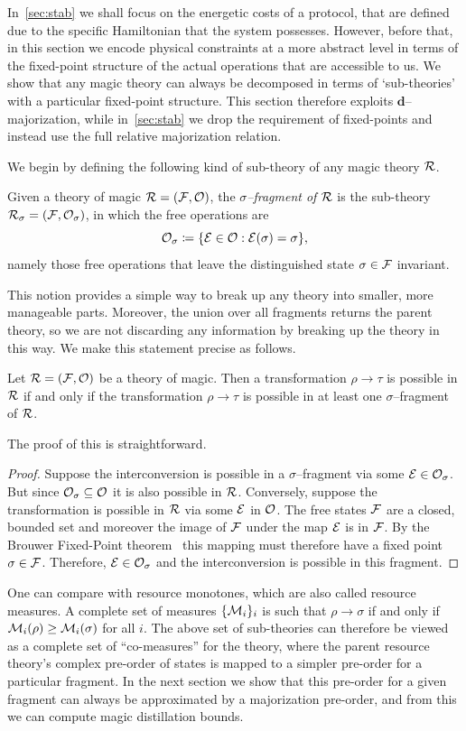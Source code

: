 \documentclass[pra,
aps,
twocolumn,
superscriptaddress,
groupedaddress,
nofootinbib,
reprint
]{revtex4-1}
\begin{document}
In~\cref{sec:stab} we shall focus on the energetic costs of a protocol, that are defined due to the specific Hamiltonian that the system possesses. However, before that, in this section we encode physical constraints at a more abstract level in terms of the fixed-point structure of  the actual operations that are accessible to us. We show that any magic theory can always be decomposed in terms of `sub-theories' with a particular fixed-point structure. This section therefore exploits $\mathbf{d}$--majorization, while in~\cref{sec:stab} we drop the requirement of fixed-points and instead use the full relative majorization relation.
 
 We begin by defining the following kind of sub-theory of any magic theory ${\mathcal R}$.
\begin{definition}\label{def:sigmafrag}
   Given a theory of magic ${\mathcal R} = ({\mathcal F}, {\mathcal O})$, the \emph{$\sigma$--fragment of ${\mathcal R}$} is the sub-theory ${\mathcal R}_\sigma = ({\mathcal F}, {\mathcal O}_\sigma)$, in which the free operations are 
   \begin{equation}
        {\mathcal O}_\sigma \coloneqq \{ {\mathcal E} \in {\mathcal O}: {\mathcal E}(\sigma) = \sigma \},
    \end{equation}
namely those free operations that leave the distinguished state $\sigma \in {\mathcal F}$ invariant.
\end{definition}
This notion provides a simple way to break up any theory into smaller, more manageable parts. Moreover, the union over all fragments returns the parent theory, so we are not discarding any information by breaking up the theory in this way. We make this statement precise as follows.
\begin{theorem}\label{thm:frag}
    Let ${\mathcal R} = ({\mathcal F}, {\mathcal O})$ be a theory of magic.
Then a transformation $\rho \rightarrow \tau$ is possible in ${\mathcal R}$ if and only if the transformation $\rho \rightarrow \tau$ is possible in at least one $\sigma$--fragment of ${\mathcal R}$.
\end{theorem}
The proof of this is straightforward.
\begin{proof}
   Suppose the interconversion is possible in a $\sigma$--fragment via some ${\mathcal E} \in {\mathcal O}_\sigma$. But since ${\mathcal O}_\sigma \subseteq {\mathcal O}$ it is also possible in ${\mathcal R}$. Conversely, suppose the transformation is possible in ${\mathcal R}$ via some ${\mathcal E}$ in ${\mathcal O}$. The free states ${\mathcal F}$ are a closed, bounded set and moreover the image of ${\mathcal F}$ under the map ${\mathcal E}$ is in ${\mathcal F}$. By the Brouwer Fixed-Point theorem~\cite{cit:brouwer} this mapping must therefore have a fixed point $\sigma \in {\mathcal F}$. Therefore, ${\mathcal E} \in {\mathcal O}_\sigma$ and the interconversion is possible in this fragment.
\end{proof}
One can compare with resource monotones, which are also called resource measures. A complete set of measures $\{{\mathcal M}_i\}_i$ is such that $\rho \rightarrow \sigma$ if and only if ${\mathcal M}_i(\rho) \ge {\mathcal M}_i(\sigma)$ for all $i$. The above set of sub-theories can therefore be viewed as a complete set of ``co-measures'' for the theory, where the parent resource theory's complex pre-order of states is mapped to a simpler pre-order for a particular fragment. In the next section we show that this pre-order for a given fragment can always be approximated by a majorization pre-order, and from this we can compute magic distillation bounds.
\end{document}
